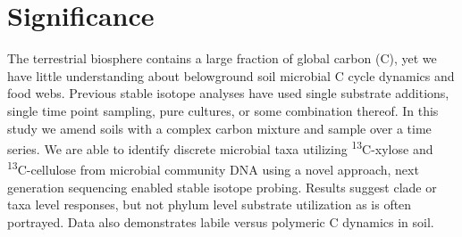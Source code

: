 \section{Significance} 
The terrestrial biosphere contains a large fraction of global carbon (C), yet we have little understanding about belowground soil microbial C cycle dynamics and food webs. Previous stable isotope analyses have used single substrate additions, single time point sampling, pure cultures, or some combination thereof.  In this study we amend soils with a complex carbon mixture and sample over a time series. We are able to identify discrete microbial taxa utilizing \textsuperscript{13}C-xylose and \textsuperscript{13}C-cellulose from microbial community DNA using a novel approach, next generation sequencing enabled stable isotope probing. Results suggest clade or taxa level responses, but not phylum level substrate utilization as is often portrayed. Data also demonstrates labile versus polymeric C dynamics in soil.  